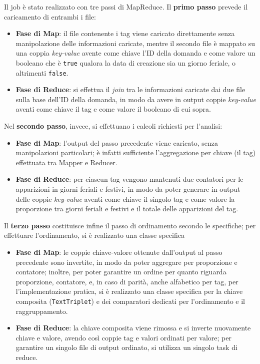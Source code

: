   Il job è stato realizzato con tre passi di MapReduce.
  Il \textbf{primo passo} prevede il caricamento di entrambi i file:
  \begin{itemize}
    \item
      \textbf{Fase di Map}:
      il file contenente i tag viene caricato direttamente senza manipolazione delle informazioni caricate,
      mentre il secondo file è mappato su una coppia \textit{key-value} avente come chiave l'ID della domanda
      e come valore un booleano che è \texttt{true} qualora la data di creazione sia un giorno feriale, o altrimenti \texttt{false}.

    \item
      \textbf{Fase di Reduce}:
      si effettua il \textit{join} tra le informazioni caricate dai due file sulla base dell'ID della domanda,
      in modo da avere in output coppie \textit{key-value} aventi come chiave il tag e come valore il booleano di cui sopra.
  \end{itemize}

  Nel \textbf{secondo passo}, invece, si effettuano i calcoli richiesti per l'analisi:
  \begin{itemize}
    \item
      \textbf{Fase di Map}:
      l'output del passo precedente viene caricato, senza manipolazioni particolari;
      è infatti sufficiente l'aggregazione per chiave (il tag) effettuata tra Mapper e Reducer.

    \item
      \textbf{Fase di Reduce}:
      per ciascun tag vengono mantenuti due contatori per le apparizioni in giorni feriali e festivi,
      in modo da poter generare in output delle coppie \textit{key-value} aventi come chiave il singolo tag e come valore la proporzione tra giorni feriali e festivi e il totale delle apparizioni del tag.
  \end{itemize}

  Il \textbf{terzo passo} costituisce infine il passo di ordinamento secondo le specifiche; per effettuare l'ordinamento, si è realizzato una classe specifica
  \begin{itemize}
    \item
      \textbf{Fase di Map}:
      le coppie chiave-valore ottenute dall'output al passo precedente sono invertite, in modo da poter aggregare per proporzione e contatore;
      inoltre, per poter garantire un ordine per quanto riguarda proporzione, contatore, e, in caso di parità, anche alfabetico per tag,
      per l'implementazione pratica, si è realizzato una classe specifica per la chiave composita (\texttt{TextTriplet}) e dei comparatori dedicati per l'ordinamento e il raggruppamento.

    \item
      \textbf{Fase di Reduce}:
      la chiave composita viene rimossa e si inverte nuovamente chiave e valore, avendo così coppie tag e valori ordinati per valore;
      per garantire un singolo file di output ordinato, si utilizza un singolo task di reduce.
  \end{itemize}

